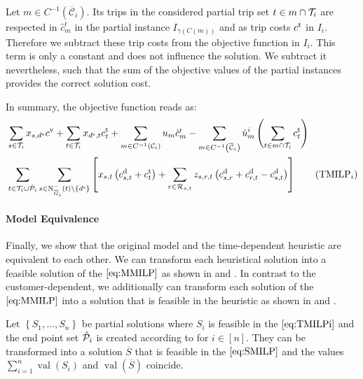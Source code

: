 Let ${m\in C^{-1}\left(\overline{\mathcal{C}}_i\right)}$. Its trips in the considered partial trip set ${t\in m\cap\mathcal{T}_i}$ are respected in $\hat{c}^{\operatorname{r}}_m$ in the partial instance $I_{\gamma(C(m))}$ and as trip costs $c^{\operatorname{t}}$ in $I_i$. Therefore we subtract these trip costs from the objective function in $I_i$. This term is only a constant and does not influence the solution. We subtract it nevertheless, such that the sum of the objective values of the partial instances provides the correct solution cost.

In summary, the objective function reads as:
\begin{align}
	& \sum_{s\in\Ti} x_{s,\de}\cv + \sum_{t\in\Ti} x_{\ds, t}\ct_t + \sum_{m\in C^{-1}\left(\mathcal{C}_i\right)} u_m \hat{c}^{\operatorname{r}}_m - \sum_{m\in C^{-1}\left(\overline{\mathcal{C}}_i\right)} \hat{u}^i_m \left(\sum_{t\in m\cap\Ti} \ct_t\right)\nonumber \\
	& \sum_{t\in\Ti\cup\Phat_i}\sum_{s\in\Ninoi(t)\backslash\left\{\ds\right\}}\left[x_{s,t}\left(\cd_{s,t}+\ct_t\right)+\sum_{r\in\Rst}z_{s,r,t}\left(\cd_{s,r}+\cd_{r,t}-\cd_{s,t}\right)\right] \tag{$\operatorname{TMILP}_i$} \label{eq:TMILPi}
\end{align}

\paragraph{Model Equivalence} \parfill

Finally, we show that the original model and the time-dependent heuristic are equivalent to each other. We can transform each heuristical solution into a feasible solution of the $\eqref{eq:MMILP}$ as shown in  and . In contrast to the customer-dependent, we additionally can transform each solution of the $\eqref{eq:MMILP}$ into a solution that is feasible in the heuristic as shown in  and .

\begin{theorem}
\label{thm:equivalence_TMILP_SMILP}

Let $\left\{S_1,\dots,S_n\right\}$ be partial solutions where $S_i$ is feasible in the $\eqref{eq:TMILPi}$ and the end point set $\hat{\mathcal{P}}_i$ is created according to  for ${i\in[n]}$. They can be transformed into a solution $\overline{S}$ that is feasible in the $\eqref{eq:SMILP}$ and the values ${\sum_{i=1}^n \operatorname{val}\left(S_i\right)}$ and ${\operatorname{val}(\overline{S})}$ coincide.

\end{theorem}

